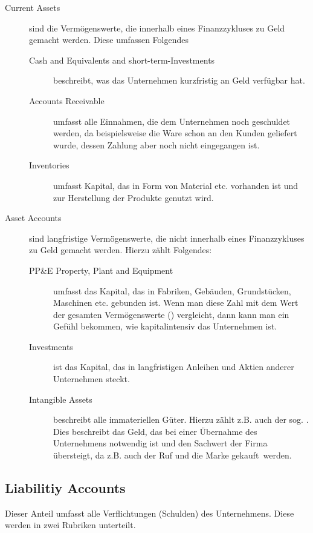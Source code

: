 \begin{description}
    \item[Current Assets] sind die Vermögenswerte, die innerhalb eines Finanzzykluses zu Geld gemacht werden.
        Diese umfassen Folgendes 
        \begin{description}
            \item[Cash and Equivalents and short-term-Investments] beschreibt, was das Unternehmen kurzfristig an Geld verfügbar hat.
            \item[Accounts Receivable] umfasst alle Einnahmen, die dem Unternehmen noch geschuldet werden, da beispielsweise die Ware schon an den Kunden geliefert wurde, dessen Zahlung aber noch nicht eingegangen ist.
            \item[Inventories] umfasst Kapital, das in Form von Material etc. vorhanden ist und zur Herstellung der Produkte genutzt wird.
        \end{description}
    \item[Asset Accounts] sind langfristige Vermögenswerte, die nicht innerhalb eines Finanzzykluses zu Geld gemacht werden.
        Hierzu zählt Folgendes:
        \begin{description}
            \item[PP\&E Property, Plant and Equipment] umfasst das Kapital, das in Fabriken, Gebäuden, Grundstücken, Maschinen etc. gebunden ist.
                Wenn man diese Zahl mit dem Wert der gesamten Vermögenswerte () vergleicht, dann kann man ein Gefühl bekommen, wie kapitalintensiv das Unternehmen ist. 
            \item[Investments] ist das Kapital, das in langfristigen Anleihen und Aktien anderer Unternehmen steckt.
            \item[Intangible Assets] beschreibt alle immateriellen Güter. Hierzu zählt z.B. auch der sog. . 
                Dies beschreibt das Geld, das bei einer Übernahme des Unternehmens notwendig ist und den Sachwert der Firma übersteigt, da z.B. auch der Ruf und die Marke \glqq gekauft\grqq\ werden.   
        \end{description}
\end{description}

%
\subsection{Liabilitiy Accounts}

Dieser Anteil umfasst alle Verflichtungen (Schulden) des Unternehmens.
Diese werden in zwei Rubriken unterteilt.

